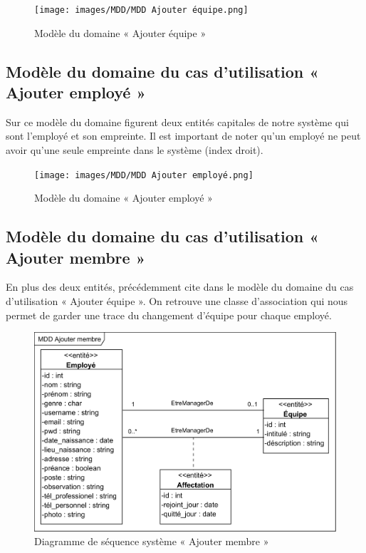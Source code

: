 \begin{figure}[h!]
    \centering
    \texttt{[image: images/MDD/MDD Ajouter équipe.png]}
    \caption{Modèle du domaine « Ajouter équipe »}
    \label{fig15}
\end{figure}
            
\subsection*{Modèle du domaine du cas d'utilisation « Ajouter employé »}
Sur ce modèle du domaine figurent deux entités capitales de notre système 
qui sont l’employé et son empreinte. Il est important de noter qu’un employé 
ne peut avoir qu’une seule empreinte dans le système (index droit).

\clearpage

\begin{figure}[h!]
    \centering
    \texttt{[image: images/MDD/MDD Ajouter employé.png]}
    \caption{Modèle du domaine « Ajouter employé »}
    \label{fig16}
\end{figure}
            
\subsection*{Modèle du domaine du cas d'utilisation « Ajouter membre »}
En plus des deux entités, précédemment cite dans le modèle du domaine du cas 
d’utilisation « Ajouter équipe ». On retrouve une classe d’association qui 
nous permet de garder une trace du changement d’équipe pour chaque employé.

\clearpage

\begin{figure}[h!]
	\centering
	\includegraphics[scale=1.22]{images/MDD/MDD Ajouter membre.png}
	\caption{Diagramme de séquence système « Ajouter membre »}
	\label{fig17}
\end{figure}


